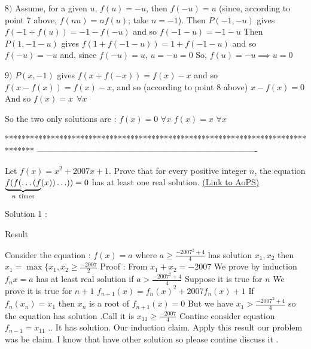 \begin{mysolution}
$ 8)$ Assume, for a given $ u$, $ f(u)=-u$, then $ f(-u)=u$ (since, according to point 7 above, $ f(nu)=nf(u)$; take $ n=-1$).
Then $ P(-1,-u)$ gives $ f(-1+f(u))=-1-f(-u)$ and so $ f(-1-u)=-1-u$
Then $ P(1,-1-u)$ gives $ f(1+f(-1-u))=1+f(-1-u)$ and so $ f(-u)=-u$ and, since $ f(-u)=u$, $ u=-u=0$
So, $ \boxed{f(u)=-u\implies u=0}$

$ 9)$ $ P(x,-1)$ gives $ f(x+f(-x))=f(x)-x$ and so $ f(x-f(x))=f(x)-x$, and so (according to point 8 above) $ x-f(x)=0$
And so $ \boxed{f(x)=x\: \: \forall x}$


So the two only solutions are :
$ f(x)=0$ $ \forall x$
$ f(x)=x$ $ \forall x$
\end{mysolution}
*******************************************************************************
-------------------------------------------------------------------------------

\begin{problem}
	Let $ f(x) = x^2 + 2007x + 1$. Prove that for every positive integer $ n$, the equation $ \underbrace{f(f(\ldots(f}_{n\ {\rm times}}(x))\ldots)) = 0$ has at least one real solution.
	\flushright \href{https://artofproblemsolving.com/community/c6h173067}{(Link to AoPS)}
\end{problem}



\begin{mysolution}
	Solution 1 :
\begin{underlined} Result \end{underlined}
Consider the equation :
$ f(x) = a$ where $ a\geq \frac { - 2007^2 + 4}{4}$ has solution $ x_1,x_2$ then 
${ x_1 = \max\{x_1,x_2}\geq \frac { - 2007}{2}$
Proof : From $ x_1 + x_2 = - 2007$
We prove by induction $ f_{n}x = a$ has at least real solution if $ a > \frac { - 2007^2 + 4}{4}$
Suppose it is true for $ n$ 
We prove it is true for $ n + 1$
$ f_{n + 1}(x) = f_n(x)^2 + 2007f_{n}(x) + 1$
If $ f_n(x_n) = x_1$ then $ x_n$ is a root of $ f_{n + 1}(x) = 0$
But we have $ x_1 > \frac { - 2007^2 + 4}{4}$ so the equation has solution .Call it is $ x_{11}\geq \frac{-2007}{4}$
Contine consider equation $ f_{n-1}=x_{11}$ ..
It has solution. 
Our induction claim.
Apply this result our problem was be claim.
I know that have other solution so please contine discuss it .
\end{mysolution}



